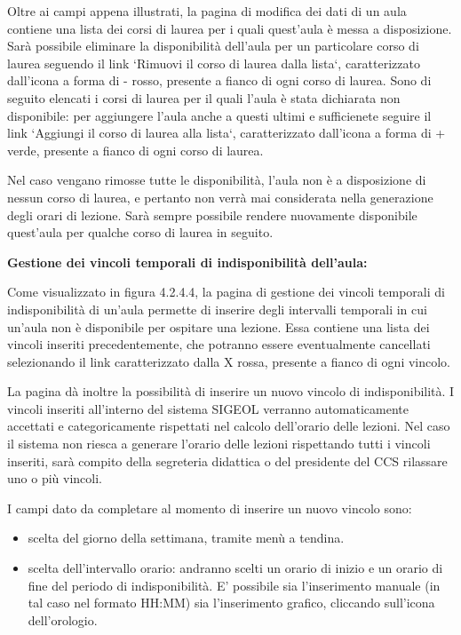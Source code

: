 \documentclass[11pt,a4paper]{article}
\begin{document}
Oltre ai campi appena illustrati, la pagina di modifica dei dati di un aula contiene una lista dei corsi di laurea per i quali quest'aula è messa a disposizione.
Sarà possibile eliminare la disponibilità dell'aula per un particolare corso di laurea seguendo il link `Rimuovi il corso di laurea dalla lista`, caratterizzato dall'icona a forma di - rosso, presente a fianco di ogni corso di laurea.
Sono di seguito elencati i corsi di laurea per il quali l'aula è stata dichiarata non disponibile: per aggiungere l'aula anche a questi ultimi e sufficienete seguire il link `Aggiungi il corso di laurea alla lista`, caratterizzato dall'icona a forma di + verde, presente a fianco di ogni corso di laurea.

Nel caso vengano rimosse tutte le disponibilità, l'aula non è a disposizione di nessun corso di laurea, e pertanto non verrà mai considerata nella generazione degli orari di lezione.
Sarà sempre possibile rendere nuovamente disponibile quest'aula per qualche corso di laurea in seguito.
\newline \newline
\begin{large}\textbf{Gestione dei vincoli temporali di indisponibilità dell'aula:}\end{large}
\newline \newline
Come visualizzato in figura 4.2.4.4, la pagina di gestione dei vincoli temporali di indisponibilità di un'aula permette di inserire degli intervalli temporali in cui un'aula non è disponibile per ospitare una lezione.
Essa contiene una lista dei vincoli inseriti precedentemente, che potranno essere eventualmente cancellati selezionando il link caratterizzato dalla X rossa, presente a fianco di ogni vincolo.

La pagina dà inoltre la possibilità di inserire un nuovo vincolo di indisponibilità.
I vincoli inseriti all'interno del sistema SIGEOL verranno automaticamente accettati e categoricamente rispettati nel calcolo dell'orario delle lezioni.
Nel caso il sistema non riesca a generare l'orario delle lezioni rispettando tutti i vincoli inseriti, sarà compito della segreteria didattica o del presidente del CCS rilassare uno o più vincoli.

I campi dato da completare al momento di inserire un nuovo vincolo sono:
\begin{itemize}
 \item scelta del giorno della settimana, tramite menù a tendina.
 \item scelta dell'intervallo orario: andranno scelti un orario di inizio e un orario di fine del periodo di indisponibilità. E' possibile sia l'inserimento manuale (in tal caso nel formato HH:MM) sia l'inserimento grafico, cliccando sull'icona dell'orologio.
\end{itemize}
\end{document}
